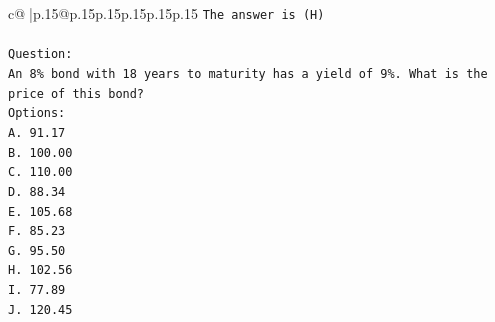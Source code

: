 \documentclass{article}
\begin{document}
{\begin{supertabular}{c@{$\;$}|p{.15\linewidth}@{}p{.15\linewidth}p{.15\linewidth}p{.15\linewidth}p{.15\linewidth}p{.15\linewidth}}
{{{\texttt{The answer is (H)} \\
\\ 
\texttt{Question:} \\
\texttt{An 8\% bond with 18 years to maturity has a yield of 9\%. What is the price of this bond?} \\
\texttt{Options:} \\
\texttt{A. 91.17} \\
\texttt{B. 100.00} \\
\texttt{C. 110.00} \\
\texttt{D. 88.34} \\
\texttt{E. 105.68} \\
\texttt{F. 85.23} \\
\texttt{G. 95.50} \\
\texttt{H. 102.56} \\
\texttt{I. 77.89} \\
\texttt{J. 120.45} \\
            }
        }
    }
     \\ \\


\end{supertabular}}
\end{document}
